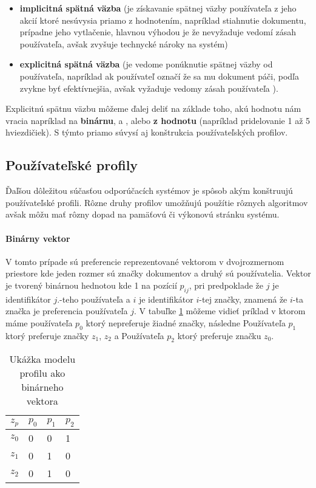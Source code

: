 \begin{itemize}
\item{\textbf{implicitná spätná väzba} (je získavanie spätnej väzby používateľa z jeho akcií
ktoré nesúvysia priamo z hodnotením, napríklad stiahnutie dokumentu, prípadne jeho vytlačenie, 
hlavnou výhodou je že nevyžaduje vedomí zásah používateľa, avšak zvyšuje technycké nároky na 
systém) }
\item{\textbf{explicitná spätná väzba} (je vedome ponúknutie spätnej väzby od používateľa,
napríklad ak používateľ označí že sa mu dokument páči, podľa \cite{basic_user_profiles}
zvykne byť efektívnejšia, avšak vyžaduje vedomy zásah používateľa )}.
\end{itemize}

Explicitnú spätnu väzbu môžeme ďalej deliť na základe toho, akú hodnotu nám vracia napríklad 
na \textbf{binárnu},  a , alebo \textbf{z hodnotu} (napríklad
pridelovanie 1 až 5 hviezdičiek). S týmto priamo súvysí aj konštrukcia používateľských profilov.

\subsection{Používateľské profily}

Ďaľšou dôležitou súčasťou odporúčacích systémov je spôsob akým konštruujú používateľské profili.
Rôzne druhy profilov umožňujú použítie rôznych algoritmov avšak môžu mať rôzny dopad na 
pamäťovú či výkonovú stránku systému\cite{basic_user_profiles}.

\paragraph{Binárny vektor}

V tomto prípade sú preferencie reprezentované vektorom v dvojrozmernom priestore kde
jeden rozmer sú značky dokumentov a druhý sú používatelia. Vektor
je tvorený binárnou hednotou kde 1 na pozícií \(p_{ij}\), pri predpoklade že \(j\) je 
identifikátor \(j\).-teho používateľa a \(i\) je identifikátor \(i\)-tej značky,
znamená že \(i\)-ta značka je preferencia používateľa \(j\).
V tabuľke \ref{table:binaryprofile} môžeme vidieť príklad v ktorom máme používateľa \(p_0\)
ktorý nepreferuje žiadné značky, následne Používateľa \(p_1\) ktorý preferuje značky \(z_1\),
\(z_2\)
a Používateľa \(p_2\) ktorý preferuje značku \(z_0\).

\begin{table}[h]
\begin{center}
\begin{tabular}{|l|l|l|l|}
\hline
 \(z_p\) & \(p_0\) & \(p_1\) & \(p_2\) \\ \hline
\(z_0\) & 0     & 0        & 1        \\ \hline
\(z_1\) & 0     & 1        & 0        \\ \hline
\(z_2\) & 0     & 1        & 0        \\ \hline
\end{tabular}
\end{center}
\caption{Ukážka modelu profilu ako binárneho vektora}
\label{table:binaryprofile}
\end{table}

